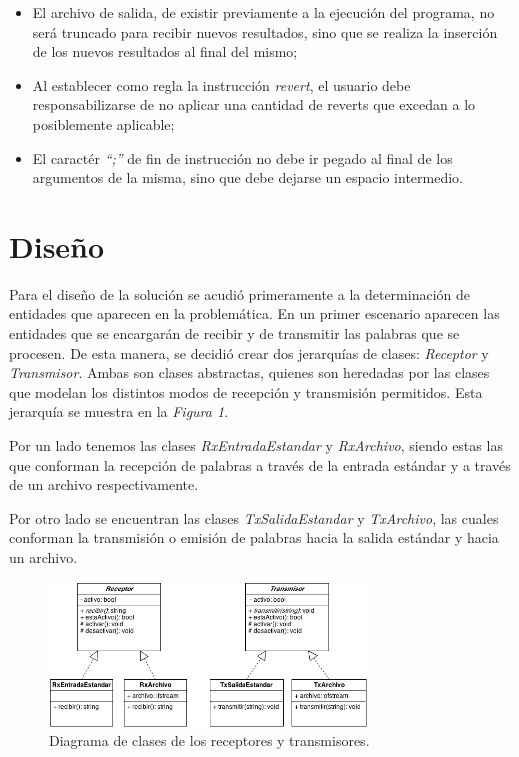 \documentclass{article}
\begin{document}
\begin{itemize}
	\itemsep=3pt \topsep=0pt \partopsep=0pt \parskip=0pt \parsep=0pt
	
	\item El archivo de salida, de existir previamente a la ejecución del programa, no será truncado para recibir nuevos resultados, sino que se realiza la inserción de los nuevos resultados al final del mismo;

	\item Al establecer como regla la instrucción \textit{revert}, el usuario debe responsabilizarse de no aplicar una cantidad de reverts que excedan a lo posiblemente aplicable;

	\item El caractér \textit{``;''} de fin de instrucción no debe ir pegado al final de los argumentos de la misma, sino que debe dejarse un espacio intermedio.


\end{itemize}
\smallskip




\section{Diseño}

	Para el diseño de la solución se acudió primeramente a la determinación de entidades que aparecen en la problemática. En un primer escenario aparecen las entidades que se encargarán de recibir y de transmitir las palabras que se procesen. De esta manera, se decidió crear dos jerarquías de clases: \textit{Receptor} y \textit{Transmisor}. Ambas son clases abstractas, quienes son heredadas por las clases que modelan los distintos modos de recepción y transmisión permitidos. Esta jerarquía se muestra en la \textit{Figura 1}.
	\par
	Por un lado tenemos las clases \textit{RxEntradaEstandar} y \textit{RxArchivo}, siendo estas las que conforman la recepción de palabras a través de la entrada estándar y a través de un archivo respectivamente.
	\par
	Por otro lado se encuentran las clases \textit{TxSalidaEstandar} y \textit{TxArchivo}, las cuales conforman la transmisión o emisión de palabras hacia la salida estándar y hacia un archivo.
	

\newpage
\begin{figure}[h]
	\centering
	\includegraphics[width=0.75\textwidth]{images/diagrama_2.png}
	\medskip
	\caption{Diagrama de clases de los receptores y transmisores.}
\end{figure}
\bigskip\bigskip
\end{document}
